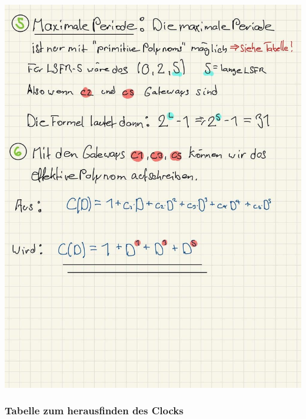 \documentclass[11pt]{article}
\begin{document}
\begin{center}
	\includegraphics[scale=0.95]{img/lsfr2_4.jpg}\\

\end{center}

\hypertarget{tabelle-zum-herausfinden-des-clocks}{%
\subsubsection{Tabelle zum herausfinden des
Clocks}\label{tabelle-zum-herausfinden-des-clocks}}
\end{document}
